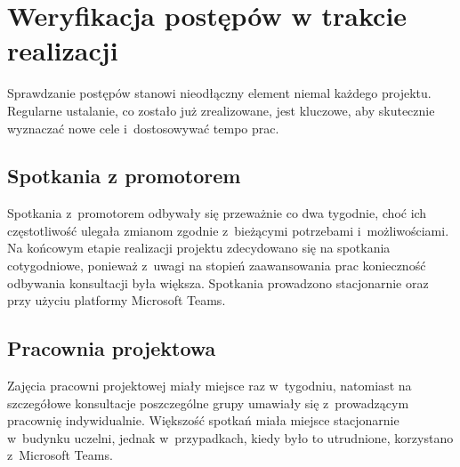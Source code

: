 
\section{Weryfikacja postępów w trakcie realizacji}

Sprawdzanie postępów stanowi nieodłączny element niemal każdego
projektu. Regularne ustalanie, co zostało już zrealizowane, jest kluczowe,
aby skutecznie wyznaczać nowe cele i~dostosowywać tempo prac.


\subsection{Spotkania z promotorem}
Spotkania z~promotorem odbywały się przeważnie co dwa tygodnie, choć ich częstotliwość
ulegała zmianom zgodnie z~bieżącymi potrzebami i~możliwościami. Na końcowym etapie realizacji projektu zdecydowano
się na spotkania cotygodniowe, ponieważ z~uwagi na stopień zaawansowania prac konieczność odbywania
konsultacji była większa. Spotkania prowadzono stacjonarnie oraz przy użyciu platformy Microsoft Teams.

\subsection{Pracownia projektowa}
Zajęcia pracowni projektowej miały miejsce raz w~tygodniu, natomiast na szczegółowe konsultacje
poszczególne grupy umawiały się z~prowadzącym pracownię indywidualnie. Większość spotkań miała
miejsce stacjonarnie w~budynku uczelni, jednak w~przypadkach, kiedy było to utrudnione, korzystano
z~Microsoft Teams.



